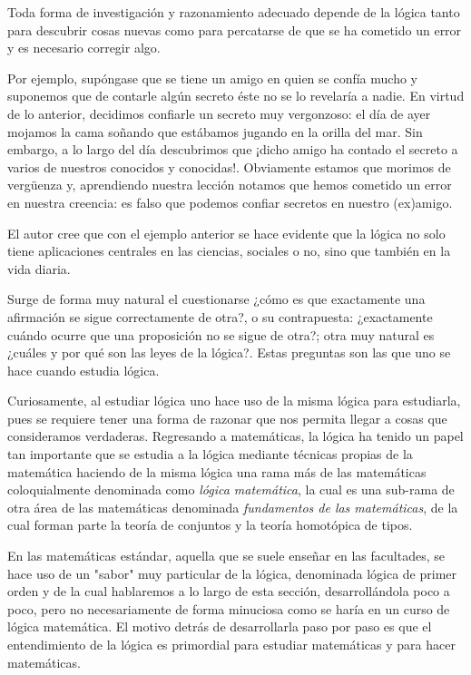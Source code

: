 \documentclass{article}
\begin{document}
Toda forma de investigación y razonamiento adecuado depende de la lógica tanto para descubrir cosas nuevas como para percatarse
de que se ha cometido un error y es necesario corregir algo. 

Por ejemplo, supóngase que se tiene un amigo en quien se confía mucho y suponemos que de contarle algún secreto éste no se 
lo revelaría a nadie. En virtud de lo anterior, decidimos confiarle un secreto muy vergonzoso: el día de ayer mojamos la cama 
soñando que estábamos jugando en la orilla del mar. Sin embargo, a lo largo del día descubrimos que ¡dicho amigo ha contado el 
secreto a varios de nuestros conocidos y conocidas!. Obviamente estamos que morimos de vergüenza y, aprendiendo nuestra lección 
notamos que hemos cometido un error en nuestra creencia: es falso que podemos confiar secretos en nuestro (ex)amigo. 

El autor cree
que con el ejemplo anterior se hace evidente que la lógica no solo tiene aplicaciones centrales en las ciencias, sociales o no,
sino que también en la vida diaria.

Surge de forma muy natural el cuestionarse ¿cómo es que exactamente una afirmación se sigue correctamente de otra?, o su 
contrapuesta: ¿exactamente cuándo ocurre que una proposición no se sigue de otra?; otra muy natural es ¿cuáles y por qué son 
las leyes de la lógica?. Estas preguntas son las que uno se hace cuando estudia lógica.

Curiosamente, al estudiar lógica uno hace uso de la misma lógica para estudiarla, pues se requiere tener una forma de razonar
que nos permita llegar a cosas que consideramos verdaderas. Regresando a matemáticas, la lógica ha tenido un papel tan
importante que se estudia a la lógica mediante técnicas propias de la matemática haciendo de la misma lógica una rama más de las
matemáticas coloquialmente denominada como \textit{lógica matemática}, la cual es una sub-rama de otra área de las matemáticas
denominada \textit{fundamentos de las matemáticas}, de la cual forman parte la teoría de conjuntos y la teoría homotópica de tipos. 

En las matemáticas estándar, aquella que se suele enseñar en las facultades, se hace uso de un "sabor" muy particular de la 
lógica, denominada lógica de primer orden y de la cual hablaremos a lo largo de esta sección, desarrollándola poco a poco, 
pero no necesariamente de forma minuciosa como se haría en un curso de lógica matemática. El motivo detrás de desarrollarla paso por 
paso es que el entendimiento de la lógica es primordial para estudiar matemáticas y para hacer matemáticas.
\end{document}
